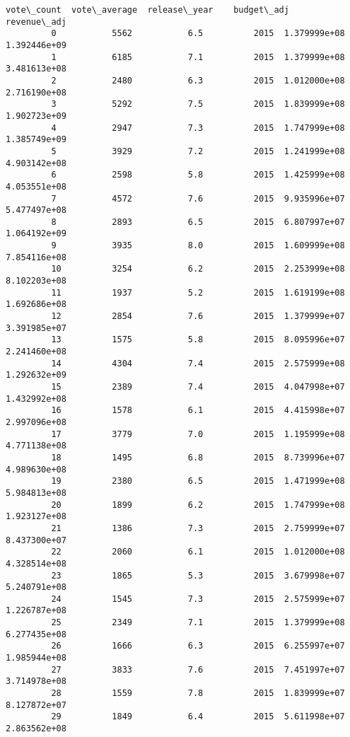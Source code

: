 \documentclass[11pt]{article}
\begin{document}
\begin{Verbatim}[commandchars=\\\{\}]
               vote\_count  vote\_average  release\_year    budget\_adj   revenue\_adj  
         0           5562           6.5          2015  1.379999e+08  1.392446e+09  
         1           6185           7.1          2015  1.379999e+08  3.481613e+08  
         2           2480           6.3          2015  1.012000e+08  2.716190e+08  
         3           5292           7.5          2015  1.839999e+08  1.902723e+09  
         4           2947           7.3          2015  1.747999e+08  1.385749e+09  
         5           3929           7.2          2015  1.241999e+08  4.903142e+08  
         6           2598           5.8          2015  1.425999e+08  4.053551e+08  
         7           4572           7.6          2015  9.935996e+07  5.477497e+08  
         8           2893           6.5          2015  6.807997e+07  1.064192e+09  
         9           3935           8.0          2015  1.609999e+08  7.854116e+08  
         10          3254           6.2          2015  2.253999e+08  8.102203e+08  
         11          1937           5.2          2015  1.619199e+08  1.692686e+08  
         12          2854           7.6          2015  1.379999e+07  3.391985e+07  
         13          1575           5.8          2015  8.095996e+07  2.241460e+08  
         14          4304           7.4          2015  2.575999e+08  1.292632e+09  
         15          2389           7.4          2015  4.047998e+07  1.432992e+08  
         16          1578           6.1          2015  4.415998e+07  2.997096e+08  
         17          3779           7.0          2015  1.195999e+08  4.771138e+08  
         18          1495           6.8          2015  8.739996e+07  4.989630e+08  
         19          2380           6.5          2015  1.471999e+08  5.984813e+08  
         20          1899           6.2          2015  1.747999e+08  1.923127e+08  
         21          1386           7.3          2015  2.759999e+07  8.437300e+07  
         22          2060           6.1          2015  1.012000e+08  4.328514e+08  
         23          1865           5.3          2015  3.679998e+07  5.240791e+08  
         24          1545           7.3          2015  2.575999e+07  1.226787e+08  
         25          2349           7.1          2015  1.379999e+08  6.277435e+08  
         26          1666           6.3          2015  6.255997e+07  1.985944e+08  
         27          3833           7.6          2015  7.451997e+07  3.714978e+08  
         28          1559           7.8          2015  1.839999e+07  8.127872e+07  
         29          1849           6.4          2015  5.611998e+07  2.863562e+08  

\end{Verbatim}
\end{document}
